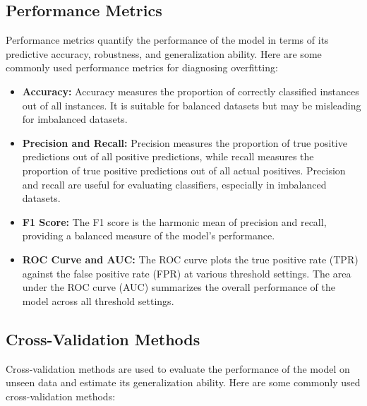 \documentclass[12pt]{book} %
\begin{document}
\subsection{Performance Metrics}

Performance metrics quantify the performance of the model in terms of its predictive accuracy, robustness, and generalization ability. Here are some commonly used performance metrics for diagnosing overfitting:

\begin{itemize}
    \item \textbf{Accuracy:} Accuracy measures the proportion of correctly classified instances out of all instances. It is suitable for balanced datasets but may be misleading for imbalanced datasets.
    
    \item \textbf{Precision and Recall:} Precision measures the proportion of true positive predictions out of all positive predictions, while recall measures the proportion of true positive predictions out of all actual positives. Precision and recall are useful for evaluating classifiers, especially in imbalanced datasets.
    
    \item \textbf{F1 Score:} The F1 score is the harmonic mean of precision and recall, providing a balanced measure of the model's performance.
    
    \item \textbf{ROC Curve and AUC:} The ROC curve plots the true positive rate (TPR) against the false positive rate (FPR) at various threshold settings. The area under the ROC curve (AUC) summarizes the overall performance of the model across all threshold settings.
\end{itemize}

\subsection{Cross-Validation Methods}

Cross-validation methods are used to evaluate the performance of the model on unseen data and estimate its generalization ability. Here are some commonly used cross-validation methods:
\end{document}
